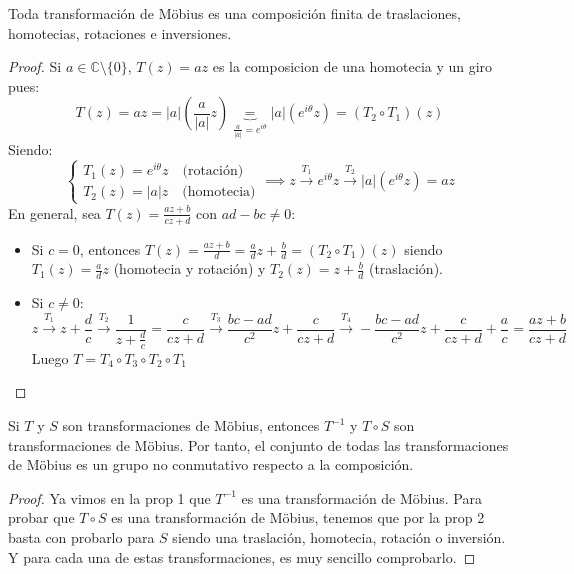 \begin{proposición}
    Toda transformación de Möbius es una composición finita de traslaciones, homotecias, rotaciones e inversiones.
\end{proposición}

\begin{proof}
    Si $a \in \mathbb{C} \setminus \{0\}$, $T(z) = az$ es la composicion de una homotecia y un giro pues:
    \[
    T(z) =
    az =
    |a|(\frac{a}{|a|}z) \underbrace{=}_{\frac{a}{|a|} = e^{i\theta}}
    |a|(e^{i\theta}z) =
    (T_2 \circ T_1)(z)
    \]
    Siendo:
    \[
    \begin{cases}
        T_1(z) = e^{i\theta}z \quad \text{(rotación)} \\
        T_2(z) = |a|z \quad \text{(homotecia)}
    \end{cases} \implies
    z \xrightarrow{T_1} e^{i\theta}z \xrightarrow{T_2} |a|(e^{i\theta}z) = az
    \]
    En general, sea $T(z) = \frac{az + b}{cz + d}$ con $ad - bc \neq 0$:
    \begin{itemize}
        \item Si $c = 0$, entonces $T(z) = \frac{az + b}{d} = \frac{a}{d}z + \frac{b}{d} = (T_2 \circ T_1)(z)$ siendo $T_1(z) = \frac{a}{d}z$ (homotecia y rotación) y $T_2(z) = z + \frac{b}{d}$ (traslación).
        \item Si $c \neq 0$:
        \[
        z \xrightarrow{T_1} 
        z + \frac{d}{c} \xrightarrow{T_2} 
        \frac{1}{z + \frac{d}{c}} = \frac{c}{cz + d} \xrightarrow{T_3} 
        \frac{bc - ad}{c^2}z + \frac{c}{cz + d} \xrightarrow{T_4} 
        -\frac{bc - ad}{c^2}z + \frac{c}{cz + d} + \frac{a}{c} =
        \frac{az + b}{cz + d}
        \]
        Luego $T = T_4 \circ T_3 \circ T_2 \circ T_1$
    \end{itemize}
\end{proof}

\begin{proposición}
    Si $T$ y $S$ son transformaciones de Möbius, entonces $T^{-1}$ y $T \circ S$ son transformaciones de Möbius. Por tanto, el conjunto de todas las transformaciones de Möbius es un grupo no conmutativo respecto a la composición.
\end{proposición}

\begin{proof}
    Ya vimos en la prop 1 que $T^{-1}$ es una transformación de Möbius. Para probar que $T \circ S$ es una transformación de Möbius, tenemos que por la prop 2 basta con probarlo para $S$ siendo una traslación, homotecia, rotación o inversión. Y para cada una de estas transformaciones, es muy sencillo comprobarlo.
\end{proof}

